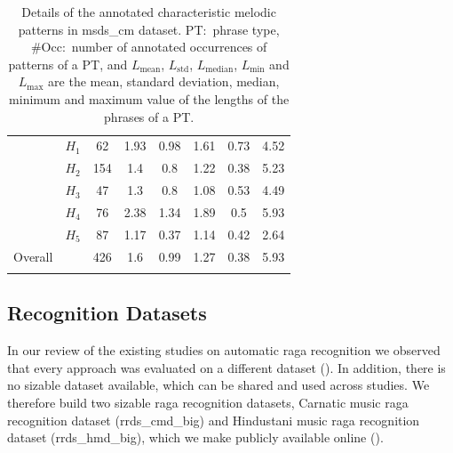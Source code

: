{{{{\begin{table}
\begin{centering}
\begin{tabular}{ c c|c c c c c c}
				\tabletop		 
				\multirow{5}{*}{\acrshort{msds_cm_hmd}} 
				&  $H_1$& 62	&	1.93 & 0.98	&	1.61 &	0.73	&	4.52\\
				& $H_2$ & 154 	& 	1.4  & 0.8 	& 	1.22 & 	0.38 	& 5.23 \\
				& $H_3$ & 47  	& 	1.3  & 0.8 	& 	1.08 & 	0.53 	& 4.49\\
				& $H_4$ & 76  	& 	2.38 & 1.34	& 	1.89 &	0.5  	& 5.93\\
				& $H_5$ & 87  	& 	1.17 & 0.37	& 	1.14 & 	0.42 	& 2.64\\
				
				\tablemid
				Overall	&  	& 426 & 1.6 & 0.99& 1.27 & 0.38 & 5.93\\
				
				\tablebot
			\end{tabular}
			\caption[Details of the annotated characteristic melodic patterns in \acrshort{msds_cm} dataset.]{Details of the annotated characteristic melodic patterns in \acrshort{msds_cm} dataset. PT:~phrase type, \#Occ:~number of annotated occurrences of patterns of a PT, and $L_{\mathrm{mean}}$, $L_{\mathrm{std}}$, $L_{\mathrm{median}}$, $L_{\mathrm{min}}$ and $L_{\mathrm{max}}$ are the mean, standard deviation, median, minimum and maximum value of the lengths of the phrases of a PT.} 
			\label{tab:categorywise_details_revised_melodic_similarity_dataset}
			\par \end{centering}
	\end{table}
		
\subsection{ Recognition Datasets}
\label{sec:corpus_raga_recognition_datasets}

In our review of the existing studies on automatic \gls{raga} recognition we observed that every approach was evaluated on a different dataset (). In addition, there is no sizable dataset available, which can be shared and used across studies. We therefore build two sizable \gls{raga} recognition datasets, Carnatic music \gls{raga} recognition dataset (\acrshort{rrds_cmd_big}) and Hindustani music \gls{raga} recognition dataset (\acrshort{rrds_hmd_big}), which we make publicly available online ().

}}}}
